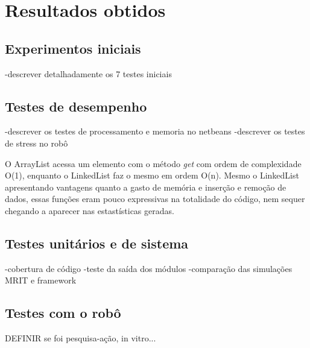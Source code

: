 \chapter[Resultados obtidos]{Resultados obtidos}

\section{Experimentos iniciais}
-descrever detalhadamente os 7 testes iniciais

\section{Testes de desempenho}
-descrever os testes de processamento e memoria no netbeans
-descrever os testes de stress no robô

O ArrayList acessa um elemento com o método \textit{get} com ordem de complexidade O(1), enquanto o LinkedList faz o mesmo em ordem O(n). Mesmo o LinkedList apresentando vantagens quanto a gasto de memória e inserção e remoção de dados, essas funções eram pouco expressivas na totalidade do código, nem sequer chegando a aparecer nas estastísticas geradas.

\section{Testes unitários e de sistema}
-cobertura de código
-teste da saída dos módulos
-comparação das simulações MRIT e framework

\section{Testes com o robô}

DEFINIR se foi pesquisa-ação, in vitro...
